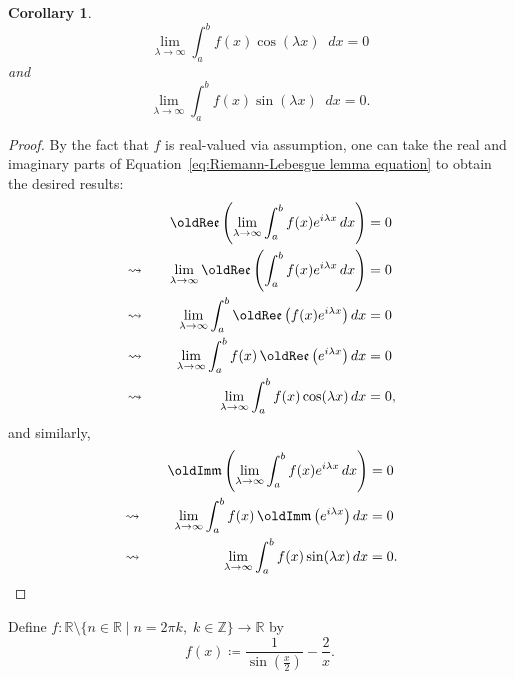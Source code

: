 \documentclass[a4paper]{article}
\newcommand*\diff{\mathop{}\!d} %
\renewcommand{\Im}{\mathop{\oldIm\mathfrak{m}}}
\renewcommand{\Re}{\mathop{\oldRe\mathfrak{e}}}
\newtheorem{corollary}{Corollary}[theorem]
\theoremstyle{definition}
\begin{document}
\begin{corollary} \label{thm:Riemann-Lebesgue corollary}
    \begin{equation}
        \lim_{\lambda \to \infty} \int_{a}^{b} f(x) \cos(\lambda x) \diff x = 0
    \end{equation}
    and
    \begin{equation}
        \lim_{\lambda \to \infty} \int_{a}^{b} f(x) \sin(\lambda x) \diff x = 0.
    \end{equation}
\end{corollary}
\begin{proof}
    By the fact that $f$ is real-valued via assumption, one can take the real and imaginary parts of Equation~\eqref{eq:Riemann-Lebesgue lemma equation} to obtain the desired results:
    \begin{alignat*}{3}
         &                & \Re \left(\lim_{\lambda \to \infty} \int_{a}^{b} f(x) e^{i\lambda x} \diff x \right) & = 0  \\
         & \leadsto \quad & \lim_{\lambda \to \infty} \Re \left(\int_{a}^{b} f(x) e^{i\lambda x} \diff x \right) & = 0  \\
         & \leadsto \quad & \lim_{\lambda \to \infty} \int_{a}^{b} \Re\left( f(x) e^{i\lambda x}\right) \diff x  & = 0  \\
         & \leadsto \quad & \lim_{\lambda \to \infty} \int_{a}^{b} f(x) \Re\left( e^{i\lambda x}\right) \diff x  & = 0  \\
         & \leadsto \quad & \lim_{\lambda \to \infty} \int_{a}^{b} f(x) \cos(\lambda x) \diff x                  & = 0,
    \end{alignat*}
    and similarly,
    \begin{alignat*}{3}
         &                & \Im \left(\lim_{\lambda \to \infty} \int_{a}^{b} f(x) e^{i\lambda x} \diff x \right) & = 0  \\
         & \leadsto \quad & \lim_{\lambda \to \infty} \int_{a}^{b} f(x) \Im\left( e^{i\lambda x}\right) \diff x  & = 0  \\
         & \leadsto \quad & \lim_{\lambda \to \infty} \int_{a}^{b} f(x) \sin(\lambda x) \diff x                  & = 0.
    \end{alignat*}
\end{proof}
Define $f: \mathbb{R} \setminus \{n \in \mathbb{R} \mid n = 2\pi k, \; k \in \mathbb{Z} \} \to \mathbb{R}$ by
\begin{equation*}
    f(x) \coloneq \frac{1}{\sin\left(\frac{x}{2}\right)} - \frac{2}{x}.
\end{equation*}
\end{document}
